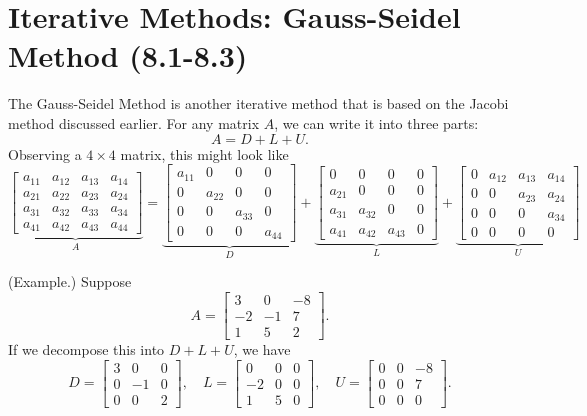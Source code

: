 \documentclass[letterpaper]{article}
\newcommand{\0}{\mathbf{0}}
\begin{document}
\section{Iterative Methods: Gauss-Seidel Method (8.1-8.3)}
The Gauss-Seidel Method is another iterative method that is based on the Jacobi method discussed earlier. For any matrix $A$, we can write it into three parts: 
\[A = D + L + U.\]
Observing a $4 \times 4$ matrix, this might look like 
\[\underbrace{\begin{bmatrix}
    a_{11} & a_{12} & a_{13} & a_{14} \\ 
    a_{21} & a_{22} & a_{23} & a_{24} \\ 
    a_{31} & a_{32} & a_{33} & a_{34} \\ 
    a_{41} & a_{42} & a_{43} & a_{44} 
\end{bmatrix}}_{A} = \underbrace{\begin{bmatrix}
    a_{11} & 0 & 0 & 0 \\ 
    0 & a_{22} & 0 & 0 \\ 
    0 & 0 & a_{33} & 0 \\ 
    0 & 0 & 0 & a_{44} 
\end{bmatrix}}_{D} + \underbrace{\begin{bmatrix}
    0 & 0 & 0 & 0  \\
    a_{21} & 0 & 0 & 0 \\ 
    a_{31} & a_{32} & 0 & 0 \\ 
    a_{41} & a_{42} & a_{43} & 0 
\end{bmatrix}}_{L} + \underbrace{\begin{bmatrix}
    0 & a_{12} & a_{13} & a_{14} \\ 
    0 & 0 & a_{23} & a_{24}  \\
    0 & 0 & 0 & a_{34}  \\
    0 & 0 & 0 & 0
\end{bmatrix}}_{U}\]

\begin{mdframed}
    (Example.) Suppose \[A = \begin{bmatrix}
        3 & 0 & -8 \\ 
        -2 & -1 & 7 \\ 
        1 & 5 & 2
    \end{bmatrix}.\]
    If we decompose this into $D + L + U$, we have 
    \[D = \begin{bmatrix}
        3 & 0 & 0 \\ 0 & -1 & 0 \\ 0 & 0 & 2
    \end{bmatrix}, \quad L = \begin{bmatrix}
        0 & 0 & 0 \\ -2 & 0 & 0 \\ 1 & 5 & 0
    \end{bmatrix}, \quad U = \begin{bmatrix}
        0 & 0 & -8 \\ 0 & 0 & 7 \\ 0 & 0 & 0
    \end{bmatrix}.\]
\end{mdframed}
\end{document}
